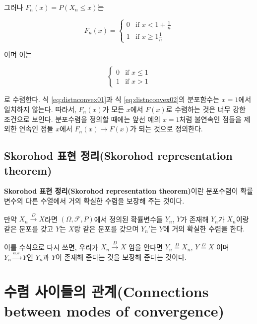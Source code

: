 \documentclass[b5paper,]{scrbook}
\theoremstyle{plain}
\theoremstyle{definition}
\numberwithin{equation}{section}
\let\BeginKnitrBlock\begin \let\EndKnitrBlock\end
\begin{document}
그러나 \(F_{n}(x)=P(X_{n}\leq x)\)는

\begin{equation}
F_{n}(x)=
\begin{cases}
0 & \text{if } x < 1 + \frac{1}{n} \\
1 & \text{if } x \geq 1 \frac{1}{n}
\end{cases}
\label{eq:distnconvex02}
\end{equation}

이며 이는

\begin{equation}
\begin{cases}
0 & \text{if } x \leq 1 \\
1 & \text{if } x > 1
\end{cases}
\end{equation}

로 수렴한다. 식 \eqref{eq:distnconvex01}과 식 \eqref{eq:distnconvex02}의
분포함수는 \(x=1\)에서 일치하지 않는다. 따라서, \(F_{n}(x)\)가 모든
\(x\)에서 \(F(x)\)로 수렴하는 것은 너무 강한 조건으로 보인다. 분포수렴을
정의할 때에는 앞선 예의 \(x=1\)처럼 불연속인 점들을 제외한 연속인 점들
\(x\)에서 \(F_{n}(x) \rightarrow F(x)\)가 되는 것으로 정의한다.

\subsection{Skorohod 표현 정리(Skorohod representation
theorem)}\label{skorohod--skorohod-representation-theorem}

\textbf{Skorohod 표현 정리(Skorohod representation theorem)}이란
분포수렴이 확률변수의 다른 수열에서 거의 확실한 수렴을 보장해 주는
것이다.

\BeginKnitrBlock{theorem}[Skorohod 표현 정리]
\protect\hypertarget{thm:unnamed-chunk-79}{}{\label{thm:unnamed-chunk-79}
{} }만약
\(X_{n} \stackrel{D}{\rightarrow} X\)라면
\((\Omega, \mathcal{F}, P)\)에서 정의된 확률변수들 \(Y_{n}\), \(Y\)가
존재해 \(Y_{n}\)가 \(X_{n}\)이랑 같은 분포를 갖고 \(Y\)는 \(X\)랑 같은
분포를 갖으며 \(Y_{n}'\)는 \(Y\)에 거의 확실한 수렴을 한다.
\EndKnitrBlock{theorem}

이를 수식으로 다시 쓰면, 우리가 \(X_{n} \stackrel{D}{\rightarrow} X\)
임을 안다면 \(Y_{n}\stackrel{D}{=}X_{n}\), \(Y\stackrel{D}{=}X\) 이며
\(Y_{n}\stackrel{a.s.}{\rightarrow}Y\)인 \(Y_{n}\)과 \(Y\)이 존재해
준다는 것을 보장해 준다는 것이다.

\section{수렴 사이들의 관계(Connections between modes of
convergence)}\label{--connections-between-modes-of-convergence}
\end{document}
